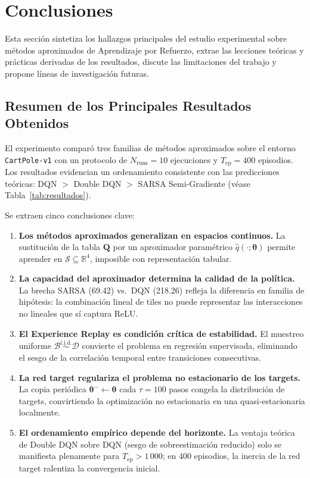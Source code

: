 \section{Conclusiones}

Esta sección sintetiza los hallazgos principales del estudio experimental sobre métodos aproximados de Aprendizaje por Refuerzo, extrae las lecciones teóricas y prácticas derivadas de los resultados, discute las limitaciones del trabajo y propone líneas de investigación futuras.

\subsection{Resumen de los Principales Resultados Obtenidos}

El experimento comparó tres familias de métodos aproximados sobre el entorno \texttt{CartPole-v1} con un protocolo de $N_\text{runs} = 10$ ejecuciones y $T_\text{ep} = 400$ episodios. Los resultados evidencian un ordenamiento consistente con las predicciones teóricas: DQN $>$ Double DQN $>$ SARSA Semi-Gradiente (véase Tabla~\ref{tab:resultados}).

Se extraen cinco conclusiones clave:

\begin{enumerate}
  \item \textbf{Los métodos aproximados generalizan en espacios continuos.} La sustitución de la tabla $\mathbf{Q}$ por un aproximador paramétrico $\hat{q}(\cdot;\boldsymbol{\theta})$ permite aprender en $\mathcal{S} \subseteq \mathbb{R}^4$, imposible con representación tabular.

  \item \textbf{La capacidad del aproximador determina la calidad de la política.} La brecha SARSA (69.42) vs.\ DQN (218.26) refleja la diferencia en familia de hipótesis: la combinación lineal de tiles no puede representar las interacciones no lineales que sí captura ReLU.

  \item \textbf{El Experience Replay es condición crítica de estabilidad.} El muestreo uniforme $\mathcal{B} \overset{\text{i.i.d.}}{\sim} \mathcal{D}$ convierte el problema en regresión supervisada, eliminando el sesgo de la correlación temporal entre transiciones consecutivas.

  \item \textbf{La red target regulariza el problema no estacionario de los targets.} La copia periódica $\boldsymbol{\theta}^- \leftarrow \boldsymbol{\theta}$ cada $\tau = 100$ pasos congela la distribución de targets, convirtiendo la optimización no estacionaria en una quasi-estacionaria localmente.

  \item \textbf{El ordenamiento empírico depende del horizonte.} La ventaja teórica de Double DQN sobre DQN (sesgo de sobreestimación reducido) solo se manifiesta plenamente para $T_\text{ep} > 1\,000$; en 400 episodios, la inercia de la red target ralentiza la convergencia inicial.
\end{enumerate}

